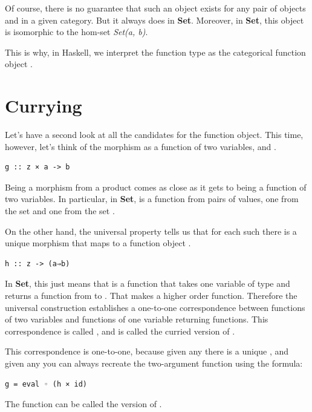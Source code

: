 \noindent
Of course, there is no guarantee that such an object  exists
for any pair of objects  and  in a given category.
But it always does in \textbf{Set}. Moreover, in \textbf{Set}, this
object is isomorphic to the hom-set \emph{Set(a, b)}.

This is why, in Haskell, we interpret the function type
 as the categorical function object
.

\section{Currying}\label{currying}

Let's have a second look at all the candidates for the function object.
This time, however, let's think of the morphism  as a function
of two variables,  and .

\begin{Verbatim}[commandchars=\\\{\}]
g :: z × a -> b
\end{Verbatim}
Being a morphism from a product comes as close as it gets to being a
function of two variables. In particular, in \textbf{Set},  is
a function from pairs of values, one from the set  and one
from the set .

On the other hand, the universal property tells us that for each such
 there is a unique morphism  that maps  to
a function object .

\begin{Verbatim}[commandchars=\\\{\}]
h :: z -> (a⇒b)
\end{Verbatim}
In \textbf{Set}, this just means that  is a function that
takes one variable of type  and returns a function from
 to . That makes  a higher order function.
Therefore the universal construction establishes a one-to-one
correspondence between functions of two variables and functions of one
variable returning functions. This correspondence is called
, and  is called the curried version of
.

This correspondence is one-to-one, because given any  there is
a unique , and given any  you can always recreate
the two-argument function  using the formula:

\begin{Verbatim}[commandchars=\\\{\}]
g = eval ◦ (h × id)
\end{Verbatim}
The function  can be called the  version of
.

